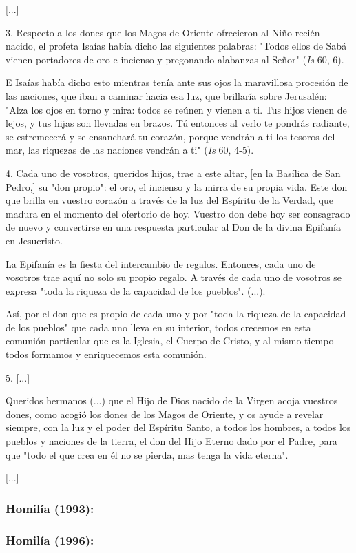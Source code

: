 {[}...{]}

3. Respecto a los dones que los Magos de Oriente ofrecieron al Niño
recién nacido, el profeta Isaías había dicho las siguientes palabras:
"Todos ellos de Sabá vienen portadores de oro e incienso y pregonando
alabanzas al Señor" (\emph{Is} 60, 6).

E Isaías había dicho esto mientras tenía ante sus ojos la maravillosa
procesión de las naciones, que iban a caminar hacia esa luz, que
brillaría sobre Jerusalén: "Alza los ojos en torno y mira: todos se
reúnen y vienen a ti. Tus hijos vienen de lejos, y tus hijas son
llevadas en brazos. Tú entonces al verlo te pondrás radiante, se
estremecerá y se ensanchará tu corazón, porque vendrán a ti los tesoros
del mar, las riquezas de las naciones vendrán a ti" (\emph{Is} 60, 4-5).

4. Cada uno de vosotros, queridos hijos, trae a este altar, {[}en la
Basílica de San Pedro,{]} su "don propio": el oro, el incienso y la
mirra de su propia vida. Este don que brilla en vuestro corazón a través
de la luz del Espíritu de la Verdad, que madura en el momento del
ofertorio de hoy. Vuestro don debe hoy ser consagrado de nuevo y
convertirse en una respuesta particular al Don de la divina Epifanía en
Jesucristo.

La Epifanía es la fiesta del intercambio de regalos. Entonces, cada uno
de vosotros trae aquí no solo su propio regalo. A través de cada uno de
vosotros se expresa "toda la riqueza de la capacidad de los pueblos".
(...).

Así, por el don que es propio de cada uno y por "toda la riqueza de la
capacidad de los pueblos" que cada uno lleva en su interior, todos
crecemos en esta comunión particular que es la Iglesia, el Cuerpo de
Cristo, y al mismo tiempo todos formamos y enriquecemos esta comunión.

5. {[}...{]}

Queridos hermanos (...) que el Hijo de Dios nacido de la Virgen acoja
vuestros dones, como acogió los dones de los Magos de Oriente, y os
ayude a revelar siempre, con la luz y el poder del Espíritu Santo, a
todos los hombres, a todos los pueblos y naciones de la tierra, el don
del Hijo Eterno dado por el Padre, para que "todo el que crea en él no
se pierda, mas tenga la vida eterna".

{[}...{]}

\subsubsection{Homilía (1993): }

\subsubsection{Homilía (1996): }



